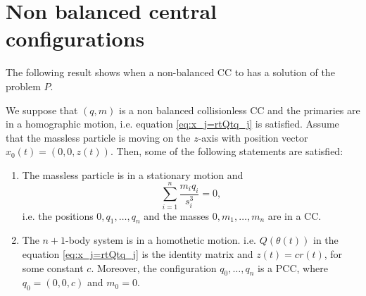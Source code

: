 \documentclass[smallcondensed]{svjour3}
\begin{document}
\section{Non balanced central configurations}

The following result shows when a non-balanced CC to has  a solution of the problem $P$.

\begin{theorem}\label{thm:no.admisible.movimiento}

We suppose that $(q,m)$ is a non balanced collisionless CC and the primaries are in a homographic motion, i.e.  equation \eqref{eq:x_j=rtQtq_j} is satisfied. Assume that the massless particle is moving on the $z$-axis with position vector $x_0(t)=(0,0,z(t))$. Then, some of the following statements are satisfied:

\begin{enumerate}
 \item\label{it:z==0} The massless particle is in a stationary motion and
 \begin{equation}\label{eq:acel.centrmasa=0}
  \sum_{i=1}^{n}\frac{m_iq_i}{s_i^3}=0,
 \end{equation}
 i.e. the positions $0,q_1,\ldots,q_n$ and the masses $0,m_1,\ldots,m_n$ are in a CC.
 \item\label{it:z=r} The $n+1$-body system is in a homothetic motion. i.e. $Q(\theta(t))$ in the equation \eqref{eq:x_j=rtQtq_j} is the identity matrix and $z(t)=cr(t)$, for some constant $c$. Moreover, the configuration $q_0,\ldots,q_n$ is a PCC, where $q_0=(0,0,c)$ and $m_0=0$.
\end{enumerate}
\end{theorem}
\end{document}
